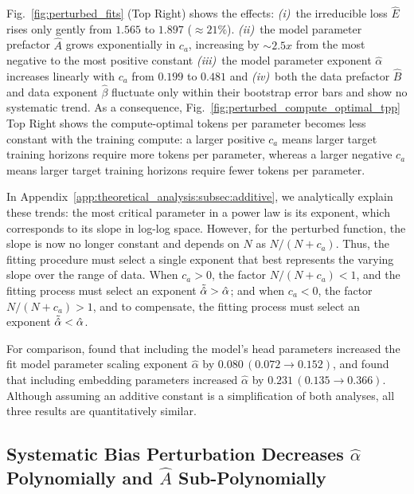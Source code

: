 Fig.~\ref{fig:perturbed_fits} (Top Right) shows the effects:
\emph{(i)}~the irreducible loss $\hat{E}$ rises only gently from $1.565$ to $1.897$ ($\approx 21\%$).
\emph{(ii)}~the model parameter prefactor $\hat{A}$ grows exponentially in $c_a$, increasing by $\sim\!2.5x$ from the most negative to the most positive constant
\emph{(iii)}~the model parameter exponent $\hat{\alpha}$ increases linearly with $c_a$ from $0.199$ to $0.481$
and \emph{(iv)}~both the data prefactor $\hat{B}$ and data exponent $\hat{\beta}$ fluctuate only within their bootstrap error bars and show no systematic trend.
As a consequence, Fig.~\ref{fig:perturbed_compute_optimal_tpp} Top Right shows the compute-optimal tokens per parameter becomes less constant with the training compute: a larger positive $c_a$ means larger target training horizons require more tokens per parameter, whereas a larger negative $c_a$  means larger target training horizons require fewer tokens per parameter.

In Appendix~\ref{app:theoretical_analysis:subsec:additive}, we analytically explain these trends: the most critical parameter in a power law is its exponent, which corresponds to its slope in log-log space.
However, for the perturbed function, the slope is now no longer constant and depends on $N$ as $N/(N + c_a)$.
Thus, the fitting procedure must select a single exponent that best represents the varying slope over the range of data.
When $c_a > 0$, the factor $N/(N+c_a) < 1$, and the fitting process must select an exponent $\Tilde{\hat{\alpha}} > \hat{\alpha}$; and when $c_a < 0$, the factor $N/(N+c_a) > 1$, and to compensate, the fitting process must select an exponent $\Tilde{\hat{\alpha}} < \hat{\alpha}$.

For comparison, \citet{porian2024resolvingdiscrepancies} found that including the model's head parameters increased the fit model parameter scaling exponent $\hat{\alpha}$ by $0.080 \, (0.072 \rightarrow 0.152)$, and \citet{pearce2024reconciling} found that including embedding parameters increased $\hat{\alpha}$ by $0.231 \, (0.135 \rightarrow 0.366)$.
Although assuming an additive constant is a simplification of both analyses, all three results are quantitatively similar.

\subsection{Systematic Bias Perturbation Decreases $\hat{\alpha}$ Polynomially and $\hat{A}$ Sub-Polynomially}
\label{sec:robustness_analysis:subsec:systematic_bias}

